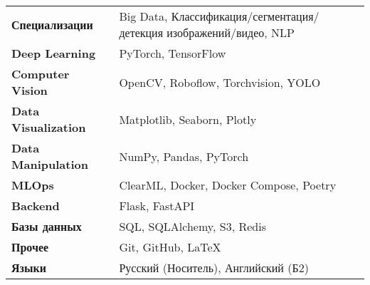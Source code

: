 
\begin{tabular}{@{}l p{0.75\textwidth\qquad}@{}}
\textbf{Специализации} & Big Data, Классификация/сегментация/детекция изображений/видео, NLP \\
\textbf{Deep Learning}   & PyTorch, TensorFlow \\
\textbf{Computer Vision}& OpenCV, Roboflow, Torchvision, YOLO \\
\textbf{Data Visualization}& Matplotlib, Seaborn, Plotly \\
\textbf{Data Manipulation}& NumPy, Pandas, PyTorch \\
\textbf{MLOps}           & ClearML, Docker, Docker Compose, Poetry \\
\textbf{Backend}         & Flask, FastAPI \\
\textbf{Базы данных}       & SQL, SQLAlchemy, S3, Redis \\
\textbf{Прочее}           & Git, GitHub, \LaTeX \\
\textbf{Языки}&Русский (Носитель), Английский (Б2)
\end{tabular}